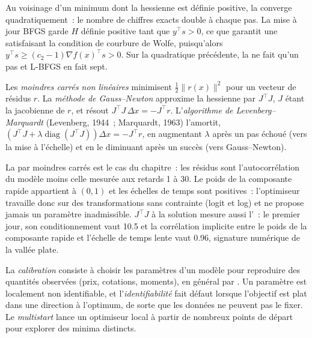 Au voisinage d'un minimum dont la hessienne est définie positive, la  converge quadratiquement~: le nombre de chiffres exacts double à chaque pas. La mise à jour BFGS garde $H$ définie positive
tant que $y^\top s > 0$, ce que garantit une  satisfaisant la condition de courbure de Wolfe, puisqu'alors $y^\top s \ge (c_2 - 1)\nabla f(x)^\top s > 0$. Sur la quadratique précédente,
la  ne fait qu'un pas et L-BFGS en fait sept.

\begin{definition}\label{def:qm:numerical-optimisation-in-practice:lm}
Les \emph{moindres carrés non linéaires} minimisent $\frac12\lVert r(x)\rVert^2$ pour un vecteur de résidus $r$. La \emph{méthode de Gauss--Newton}
approxime la hessienne par $J^\top J$, $J$ étant la jacobienne de $r$, et résout $J^\top J\,\Delta x = -J^\top r$. L'\emph{algorithme de Levenberg--Marquardt}
(Levenberg, 1944~; Marquardt, 1963) l'amortit, $(J^\top J + \lambda\operatorname{diag}(J^\top J))\Delta x = -J^\top r$, en augmentant $\lambda$ après un pas échoué (vers la 
mise à l'échelle) et en le diminuant après un succès (vers Gauss--Newton).
\end{definition}

La  par moindres carrés est le cas du chapitre~: les résidus sont l'autocorrélation du modèle moins celle mesurée aux retards 1 à 30. Le poids de la composante rapide appartient à $(0, 1)$
et les échelles de temps sont positives~: l'optimiseur travaille donc sur des transformations sans contrainte (logit et log) et ne propose jamais un paramètre inadmissible. $J^\top J$ à la solution mesure aussi
l'~: le premier jour, son conditionnement vaut 10.5 et la corrélation implicite entre le poids de la composante rapide et l'échelle de temps lente vaut 0.96, signature numérique de la
vallée plate.

\begin{definition}\label{def:qm:numerical-optimisation-in-practice:calibration}
La \emph{calibration} consiste à choisir les paramètres d'un modèle pour reproduire des quantités observées (prix, cotations, moments), en général par . Un paramètre est
localement non identifiable, et l'\emph{identifiabilité} fait défaut lorsque l'objectif est plat dans une direction à l'optimum, de sorte que les données ne peuvent pas le fixer. Le \emph{multistart}
lance un optimiseur local à partir de nombreux points de départ pour explorer des minima distincts.
\end{definition}


